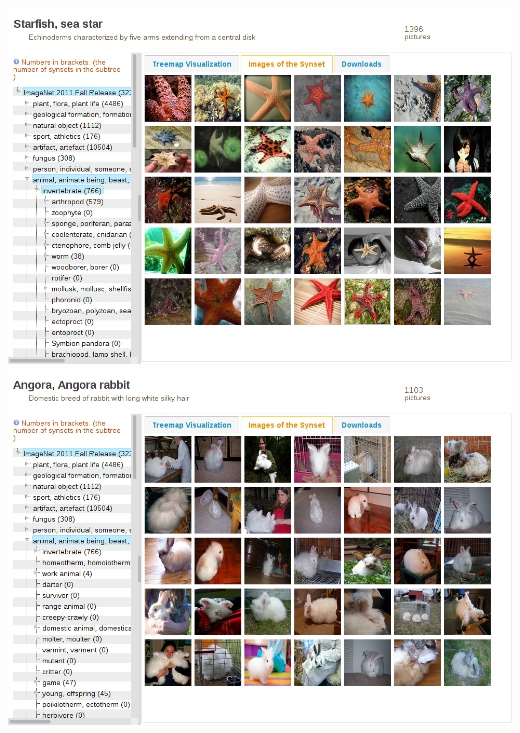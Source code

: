\documentclass[c,8pt]{beamer}
\begin{document}
\begin{frame}{}{}
\begin{center}
{
%
\includegraphics[scale=0.1]{pics/imagenet2012/imagenet2012_starfish.png}
%
%
\includegraphics[scale=0.1]{pics/imagenet2012/imagenet2012_angora-rabbit.png}
%

%

}
\end{center}
\end{frame}
\end{document}
